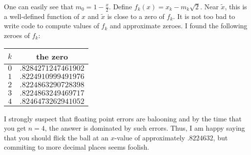 \documentclass[11pt]{article}
\theoremstyle{definition}
\begin{document}
One can easily see that $m_0 = 1-\frac{x}{2}$.  Define $f_k(x) = x_k-m_k\sqrt{2}$.  Near $\tilde{x}$, this is a well-defined function of $x$ and $\tilde{x}$ is close to a zero of $f_k$.  It is not too bad to write code to compute values of $f_k$ and approximate zeroes.  I found the following zeroes of $f_k$:

\begin{tabular}{c | c}
$k$ & the zero \\
\hline
$0$ & $.8284271247461902$ \\
$1$ & $.8224910999491976$ \\
$2$ & $.8224863290728398$ \\
$3$ & $.8224863249469717$ \\
$4$ & $.8246473262941052$
\end{tabular}

I strongly suspect that floating point errors are balooning and by the time that you get $n = 4$, the answer is dominated by such errors.  Thus, I am happy saying that you should flick the ball at an $x$-value of approximately $.8224632$, but commiting to more decimal places seems foolish.
\end{document}
